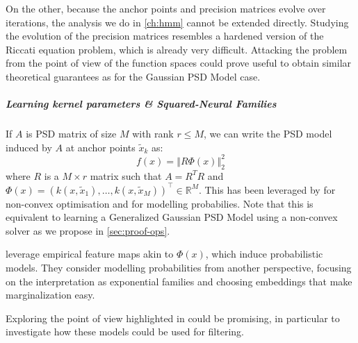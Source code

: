 On the other, because the anchor points and precision matrices evolve over iterations, the analysis we do in \cref{ch:hmm} cannot be extended directly. Studying the evolution of the precision matrices resembles a hardened version of the Riccati equation problem, which is already very difficult. Attacking the problem from the point of view of the function spaces could prove useful to obtain similar theoretical guarantees as for the Gaussian PSD Model case.

\subparagraph{Learning kernel parameters \& Squared-Neural Families} If $A$ is PSD matrix of size $M$ with rank $r \leq M$, we can write the PSD model induced by $A$ at anchor points $\tilde x_k$ as:
\begin{equation}
    f(x) = \left\Vert R\Phi(x)\right\Vert_2^2
\end{equation}
where $R$ is a $M \times r$ matrix such that $A = R^T R$ and $\Phi(x) = (k(x, \tilde x_1), \ldots, k(x, \tilde x_M))^\top\in\mathbb R^M$. This has been leveraged by \citet{gaspard} for non-convex optimisation and \citet{squared-neural-families} for modelling probabilies. Note that this is equivalent to learning a Generalized Gaussian PSD Model using a non-convex solver as we propose in \cref{sec:proof-ops}.

\cite{squared-neural-families} leverage empirical feature maps akin to $\Phi(x)$, which induce probabilistic models. They consider modelling probabilities from another perspective, focusing on the interpretation as exponential families and choosing embeddings that make marginalization easy.

Exploring the point of view highlighted in \cite{squared-neural-families} could be promising, in particular to investigate how these models could be used for filtering.
